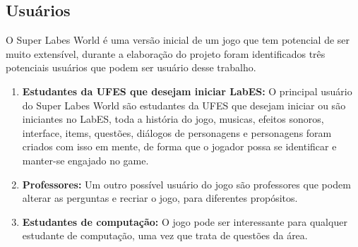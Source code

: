 \subsection{Usuários}
O Super Labes World é uma versão inicial de um jogo que tem potencial de ser muito extensível, durante a elaboração do projeto foram identificados três potenciais usuários que podem ser usuário desse trabalho.

\begin{enumerate}
    \item \textbf{Estudantes da UFES que desejam iniciar LabES:} O principal usuário do Super Labes World são estudantes da UFES que desejam iniciar ou são iniciantes no LabES, toda a história do jogo, musicas, efeitos sonoros, interface, items, questões, diálogos de personagens e personagens foram criados com isso em mente, de forma que o jogador possa se identificar e manter-se engajado no game. 
    \item \textbf{Professores:} Um outro possível usuário do jogo são professores que podem alterar as perguntas e recriar o jogo, para diferentes propósitos. 
    \item \textbf{Estudantes de computação:} O jogo pode ser interessante para qualquer estudante de computação, uma vez que trata de questões da área.
\end{enumerate}

